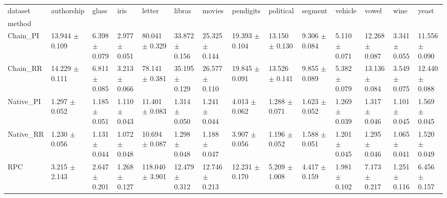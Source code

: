 \begin{tabular}{llllllllllllll}
\toprule
dataset &            authorship &                glass &                 iris &                 letter &                libras &                movies &             pendigits &             political &              segment &              vehicle &                 vowel &                 wine &                 yeast \\
method    &                       &                      &                      &                        &                       &                       &                       &                       &                      &                      &                       &                      &                       \\
\midrule
Chain_PI  &  13.944 $ \pm $ 0.109 &  6.398 $ \pm $ 0.079 &  2.977 $ \pm $ 0.051 &   80.041 $ \pm $ 0.329 &  33.872 $ \pm $ 0.156 &  25.325 $ \pm $ 0.144 &  19.393 $ \pm $ 0.104 &  13.150 $ \pm $ 0.130 &  9.306 $ \pm $ 0.084 &  5.110 $ \pm $ 0.071 &  12.268 $ \pm $ 0.087 &  3.341 $ \pm $ 0.055 &  11.556 $ \pm $ 0.090 \\
Chain_RR  &  14.229 $ \pm $ 0.111 &  6.811 $ \pm $ 0.085 &  3.213 $ \pm $ 0.066 &   78.141 $ \pm $ 0.381 &  35.195 $ \pm $ 0.129 &  26.577 $ \pm $ 0.110 &  19.845 $ \pm $ 0.091 &  13.526 $ \pm $ 0.141 &  9.855 $ \pm $ 0.089 &  5.382 $ \pm $ 0.079 &  13.136 $ \pm $ 0.084 &  3.549 $ \pm $ 0.075 &  12.440 $ \pm $ 0.088 \\
Native_PI &   1.297 $ \pm $ 0.052 &  1.185 $ \pm $ 0.051 &  1.110 $ \pm $ 0.043 &   11.401 $ \pm $ 0.083 &   1.314 $ \pm $ 0.050 &   1.241 $ \pm $ 0.044 &   4.013 $ \pm $ 0.062 &   1.288 $ \pm $ 0.071 &  1.623 $ \pm $ 0.052 &  1.269 $ \pm $ 0.039 &   1.317 $ \pm $ 0.046 &  1.101 $ \pm $ 0.045 &   1.569 $ \pm $ 0.045 \\
Native_RR &   1.230 $ \pm $ 0.056 &  1.131 $ \pm $ 0.044 &  1.072 $ \pm $ 0.048 &   10.694 $ \pm $ 0.087 &   1.298 $ \pm $ 0.048 &   1.188 $ \pm $ 0.047 &   3.907 $ \pm $ 0.056 &   1.196 $ \pm $ 0.052 &  1.588 $ \pm $ 0.051 &  1.201 $ \pm $ 0.045 &   1.295 $ \pm $ 0.046 &  1.065 $ \pm $ 0.041 &   1.520 $ \pm $ 0.049 \\
RPC       &   3.215 $ \pm $ 2.143 &  2.647 $ \pm $ 0.201 &  1.268 $ \pm $ 0.127 &  118.040 $ \pm $ 3.901 &  12.479 $ \pm $ 0.312 &  12.746 $ \pm $ 0.213 &  12.231 $ \pm $ 0.170 &   5.209 $ \pm $ 1.008 &  4.417 $ \pm $ 0.159 &  1.981 $ \pm $ 0.102 &   7.173 $ \pm $ 0.217 &  1.251 $ \pm $ 0.116 &   6.456 $ \pm $ 0.157 \\

\end{tabular}
